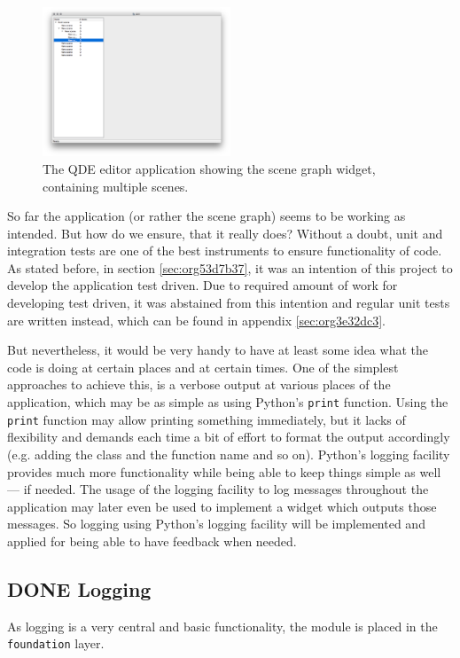\documentclass[10pt, openright, notitlepage]{scrreprt}
\begin{document}
\begin{figure}[H]
\centering
\includegraphics[width=0.5\textwidth]{./images/qde_alpha_05.png}
\caption{\label{fig:editor-alpha-04}
The QDE editor application showing the scene graph widget, containing multiple scenes.}
\end{figure}


So far the application (or rather the scene graph) seems to be working as
intended. But how do we ensure, that it really does? Without a doubt, unit and
integration tests are one of the best instruments to ensure functionality of
code. As stated before, in section \ref{sec:org53d7b37}, it was an intention of
this project to develop the application test driven. Due to required amount of
work for developing test driven, it was abstained from this intention and
regular unit tests are written instead, which can be found in appendix \ref{sec:org3e32dc3}.

But nevertheless, it would be very handy to have at least some idea what the
code is doing at certain places and at certain times.
One of the simplest approaches to achieve this, is a verbose output at various
places of the application, which may be as simple as using Python's
\texttt{print} function. Using the \texttt{print} function may allow
printing something immediately, but it lacks of flexibility and demands each
time a bit of effort to format the output accordingly (e.g. adding the class and
the function name and so on). Python's logging facility provides much more
functionality while being able to keep things simple as well --- if needed.
The usage of the logging facility to log messages throughout the application may
later even be used to implement a widget which outputs those messages. So
logging using Python's logging facility will be implemented and applied for
being able to have feedback when needed.
\subsection{{\bfseries\sffamily DONE} Logging}
\label{sec:orgff63c3b}
As logging is a very central and basic functionality, the module is placed in
the \texttt{foundation} layer.
\end{document}
